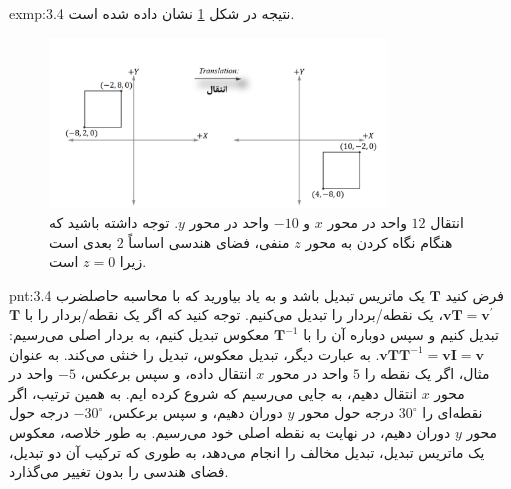 {\begin{spacing}{1.5}
\begin{exmp}{exmp:3.4}
            نتیجه در شکل \ref{fig:4.Session.1.3.6} نشان داده شده است.

            \begin{figure}[H]
                \centering
                \setlength{\belowcaptionskip}{-10pt}
                \includegraphics[width=0.8\textwidth]{Images/4/3/4.Session.1.3.6}
                \caption {انتقال $12$ واحد در محور $x$ و $-10$ واحد در محور $y$.
                توجه داشته باشید که هنگام نگاه کردن به محور $z$ منفی، فضای هندسی اساساً $2$ بعدی است زیرا $z=0$ است. \textbf{\vspace{20pt}}}
                \label{fig:4.Session.1.3.6}
            \end{figure}
        \end{exmp}

        \begin{point}{pnt:3.4}
            \Large
            فرض کنید $\textbf{T}$ یک ماتریس تبدیل باشد و به یاد بیاورید که با محاسبه حاصلضرب $\textbf{vT}=\textbf{v}^\prime$، یک نقطه/بردار را تبدیل می‌کنیم.
            توجه کنید که اگر یک نقطه/بردار را با $\textbf{T}$ تبدیل کنیم و سپس دوباره آن را با $\textbf{T}^{-1}$ معکوس تبدیل کنیم،
            به بردار اصلی می‌رسیم: $\textbf{vT}\textbf{T}^{-1}=\textbf{vI}=\textbf{v}$.
            به عبارت دیگر، تبدیل معکوس، تبدیل را خنثی می‌کند.
            به عنوان مثال، اگر یک نقطه را $5$ واحد در محور $x$ انتقال داده، و سپس برعکس، $-5$ واحد در محور $x$ انتقال دهیم، به جایی می‌رسیم که شروع کرده ایم.
            به همین ترتیب، اگر نقطه‌ای را $30^\circ$ درجه حول محور $y$ دوران دهیم، و سپس برعکس، $-30^\circ$ درجه حول محور $y$ دوران دهیم، در نهایت به نقطه اصلی خود می‌رسیم.
            به طور خلاصه، معکوس یک ماتریس تبدیل، تبدیل مخالف را انجام می‌دهد، به طوری که ترکیب آن دو تبدیل، فضای هندسی را بدون تغییر می‌گذارد.
        \end{point}
    \end{spacing}
}

